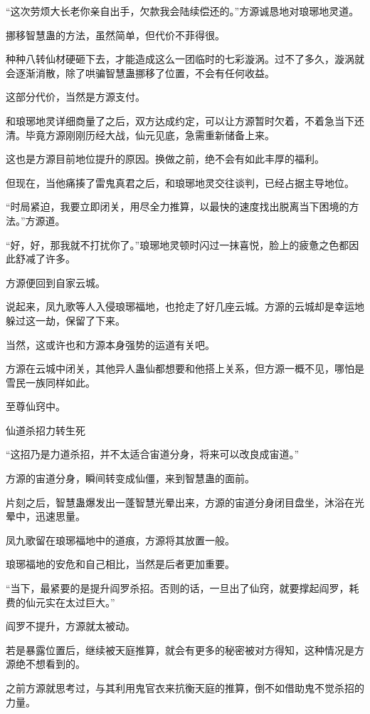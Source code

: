 \begin{this_body}
“这次劳烦大长老你亲自出手，欠款我会陆续偿还的。”方源诚恳地对琅琊地灵道。

挪移智慧蛊的方法，虽然简单，但代价不菲得很。

种种八转仙材硬砸下去，才能造成这么一团临时的七彩漩涡。过不了多久，漩涡就会逐渐消散，除了哄骗智慧蛊挪移了位置，不会有任何收益。

这部分代价，当然是方源支付。

和琅琊地灵详细商量了之后，双方达成约定，可以让方源暂时欠着，不着急当下还清。毕竟方源刚刚历经大战，仙元见底，急需重新储备上来。

这也是方源目前地位提升的原因。换做之前，绝不会有如此丰厚的福利。

但现在，当他痛揍了雷鬼真君之后，和琅琊地灵交往谈判，已经占据主导地位。

“时局紧迫，我要立即闭关，用尽全力推算，以最快的速度找出脱离当下困境的方法。”方源道。

“好，好，那我就不打扰你了。”琅琊地灵顿时闪过一抹喜悦，脸上的疲惫之色都因此舒减了许多。

方源便回到自家云城。

说起来，凤九歌等人入侵琅琊福地，也抢走了好几座云城。方源的云城却是幸运地躲过这一劫，保留了下来。

当然，这或许也和方源本身强势的运道有关吧。

方源在云城中闭关，其他异人蛊仙都想要和他搭上关系，但方源一概不见，哪怕是雪民一族同样如此。

至尊仙窍中。

仙道杀招力转生死

“这招乃是力道杀招，并不太适合宙道分身，将来可以改良成宙道。”

方源的宙道分身，瞬间转变成仙僵，来到智慧蛊的面前。

片刻之后，智慧蛊爆发出一蓬智慧光晕出来，方源的宙道分身闭目盘坐，沐浴在光晕中，迅速思量。

凤九歌留在琅琊福地中的道痕，方源将其放置一般。

琅琊福地的安危和自己相比，当然是后者更加重要。

“当下，最紧要的是提升阎罗杀招。否则的话，一旦出了仙窍，就要撑起阎罗，耗费的仙元实在太过巨大。”

阎罗不提升，方源就太被动。

若是暴露位置后，继续被天庭推算，就会有更多的秘密被对方得知，这种情况是方源绝不想看到的。

之前方源就思考过，与其利用鬼官衣来抗衡天庭的推算，倒不如借助鬼不觉杀招的力量。


\end{this_body}
